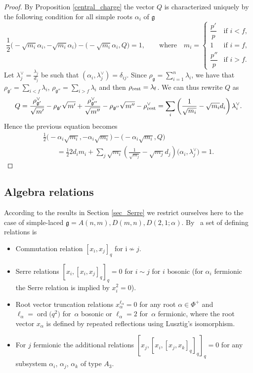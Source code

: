 \documentclass[10pt,a4paper]{amsart}
\numberwithin{equation}{section}
\renewcommand{\i}{\mathrm{i}}
\newcommand{\g}{\mathfrak{g}}
\newcommand{\f}{\mathsf{f}}
\begin{document}
\begin{proof}By Proposition \ref{central_charge} the vector $Q$ is characterized uniquely by the following condition for all simple roots $\alpha_i$ of $\mathfrak{g}$
\[
\frac{1}{2}\big({-}\sqrt{m_i}\alpha_i,-\sqrt{m_i}\alpha_i\big) -\big({-}\sqrt{m_i}\alpha_i,Q\big) =1, \qquad \text{where}\quad m_i = \begin{cases} \dfrac{p'}{p} & \text{if } i<f,\\
1 & \text{if } i=f,\\
 \dfrac{p''}{p} &  \text{if } i>f.
\end{cases}
\]
Let $\lambda_j^\vee= \frac{\lambda_j}{d_j}$ be such that $(\alpha_i, \lambda_j^\vee) = \delta_{ij}$. Since $\rho_\mathfrak{g}= \sum\limits_{i=1}^n \lambda_i$, we have that $\rho_{\mathfrak{g'}}= \sum\limits_{i<f} \lambda_i$, $\rho_{\mathfrak{g''}}= \sum\limits_{i>f} \lambda_i$ and then $\rho_{{\rm rest}} = \lambda_\f$. We can thus rewrite $Q$ as
\begin{gather*}
Q=\frac{\rho_{\mathfrak{g'}}^\vee}{\sqrt{m'}}-\rho_{\mathfrak{g'}}\sqrt{m'}+\frac{\rho_{\mathfrak{g''}}^\vee}{\sqrt{m''}}-\rho_{\mathfrak{g''}}\sqrt{m''}-\rho_{{\rm rest}}^\vee
= \sum\limits_i\left( \frac{1}{\sqrt{m_i}}-\sqrt{m_i}d_i\right) \lambda_i^\vee.
\end{gather*}
Hence the previous equation becomes
\begin{gather*}
 \frac{1}{2}\big({-}\alpha_i \sqrt{m_i},-\alpha_i \sqrt{m_i}\big)-\big({-}\alpha_i \sqrt{m_i}, Q\big) \\
\qquad{}= \frac{1}{2} 2d_i m_i+ \sum\limits_j \sqrt{m_i} \left(\frac{1}{ \sqrt{m_j}}- \sqrt{m_j} d_j\right) \big(\alpha_i, \lambda_j^\vee\big) =1.\tag*{\qed}
\end{gather*}\renewcommand{\qed}{}
\end{proof}

\subsection{Algebra relations}\label{sec_SuperNA}

 According to the results in Section \ref{sec_Serre} we restrict ourselves here to the case of simple-laced $\g=A(n,m),D(m,n),D(2,1;\alpha)$. By~\cite[Sections~4.1,~4.4 and~4.5]{AA17} a set of defining relations is
 \begin{itemize}\itemsep=0pt
 	\item Commutation relation $[x_i,x_j]_q$ for $\i\not\sim j$.
 	\item Serre relations $[x_i,[x_i,x_j]_q]_q=0$ for $i\sim j$ for $i$ bosonic (for $\alpha_i$ fermionic the Serre relation is implied by $x_i^2=0$).
 	\item Root vector truncation relations $x_\alpha^{\ell_\alpha}=0$ for any root $\alpha\in\Phi^+$ and $\ell_\alpha=\operatorname{ord}\big(q^{2}\big)$ for~$\alpha$ bosonic or $\ell_\alpha=2$ for~$\alpha$ fermionic, where the root vector $x_\alpha$ is defined by repeated reflections using Lusztig's isomorphism.
 	\item For $j$ fermionic the additional relations $[x_j,[x_i,[x_j,x_k]_q]_q]_q=0$ for any subsystem $\alpha_i$, $\alpha_j$, $\alpha_k$ of type $A_3$.
 \end{itemize}
\end{document}
